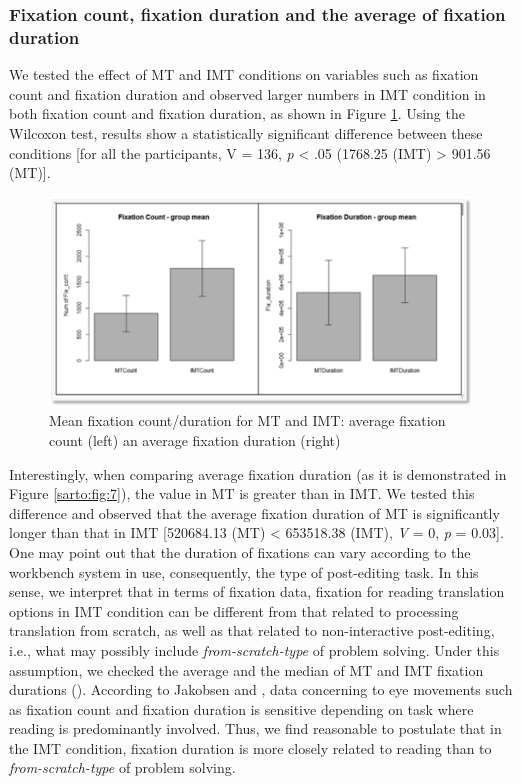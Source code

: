 \documentclass[output=paper]{langsci/langscibook}
\begin{document}
\subsubsection{Fixation count, fixation duration and the average of fixation duration}

We tested the effect of MT and IMT conditions on variables such as fixation count and fixation duration and observed larger numbers in IMT condition in both fixation count and fixation duration, as shown in Figure \ref{sarto:fig:6}. Using the Wilcoxon test, results show a statistically significant difference between these conditions [for all the participants, V = 136, \textit{p} {\textless} .05 (1768.25 (IMT) {\textgreater} 901.56 (MT)].


\begin{figure}
 \includegraphics[width=\textwidth]{figures/Sarto6.png}
 \caption{Mean fixation count/duration for MT and IMT: average fixation count (left) an average fixation duration (right)}
 \label{sarto:fig:6}
\end{figure} 



Interestingly, when comparing average fixation duration (as it is demonstrated in Figure \ref{sarto:fig:7}), the value in MT is greater than in IMT. We tested this difference and observed that the average fixation duration of MT is significantly longer than that in IMT [520684.13 (MT) {\textless} 653518.38 (IMT), \textit{V} = 0, \textit{p} = 0.03]. One may point out that the duration of fixations can vary according to the workbench system in use, consequently, the type of post-editing task. In this sense, we interpret that in terms of fixation data, fixation for reading translation options in IMT condition can be different from that related to processing translation from scratch, as well as that related to non-interactive post-editing, i.e., what may possibly include \textit{from-scratch-type} of problem solving. Under this assumption, we checked the average and the median of MT and IMT fixation durations (). According to Jakobsen and \citet{jakobsen2008}, data concerning to eye movements such as fixation count and fixation duration is sensitive depending on task where reading is predominantly involved. Thus, we find reasonable to postulate that in the IMT condition, fixation duration is more closely related to reading than to \textit{from-scratch-type} of problem solving. 
\end{document}
